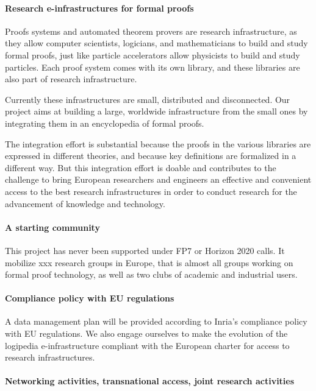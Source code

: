 \paragraph{Research e-infrastructures for formal proofs}

Proofs systems and automated theorem provers are research
infrastructure, as they allow computer scientists, logicians, and
mathematicians to build and study formal proofs, just like particle
accelerators allow physicists to build and study particles. Each proof
system comes with its own library, and these libraries are also
part of research infrastructure.

Currently these infrastructures are small, distributed and
disconnected.  Our project aims at building a large, worldwide
infrastructure from the small ones by integrating them in an
encyclopedia of formal proofs.

The integration effort is substantial because the proofs in the
various libraries are expressed in different theories, and because
key definitions are formalized in a different way.
%
But this
integration effort is doable and contributes to the challenge to bring
European researchers and engineers an effective and convenient access
to the best research infrastructures in order to conduct research for
the advancement of knowledge and technology.

\paragraph{A starting community}

This project has never been supported under FP7 or Horizon 2020 calls.
It mobilize xxx research groups in Europe, that is almost all groups
working on formal proof technology, as well as two clubs of academic
and industrial users.

\paragraph{Compliance policy with EU regulations}

A data management plan will be provided according to Inria’s
compliance policy with EU regulations. We also engage ourselves to
make the evolution of the logipedia e-infrastructure compliant with
the European charter for access to research infrastructures.

\paragraph{Networking activities, transnational access, joint research activities}

